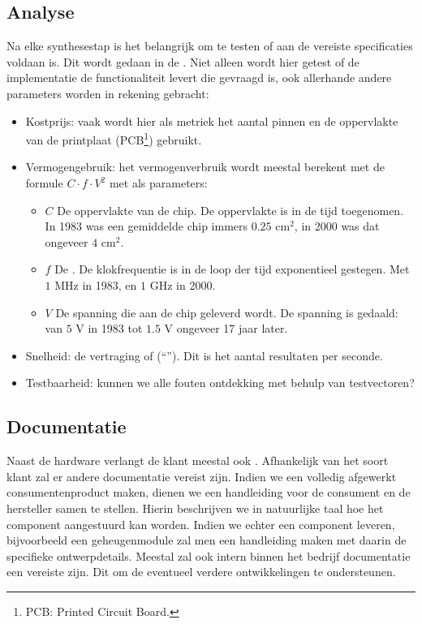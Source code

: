 \subsection{Analyse}
\label{ss:analyse}
Na elke synthesestap is het belangrijk om te testen of aan de vereiste specificaties voldaan is. Dit wordt gedaan in de . Niet alleen wordt hier getest of de implementatie de functionaliteit levert die gevraagd is, ook allerhande andere parameters worden in rekening gebracht:
\begin{itemize}
 \item Kostprijs: vaak wordt hier als metriek het aantal pinnen en de oppervlakte van de printplaat (PCB\footnote{PCB: Printed Circuit Board.}) gebruikt.
 \item Vermogengebruik: het vermogenverbruik wordt meestal berekent met de formule $C\cdot f\cdot V^2$ met als parameters:
 \begin{itemize}
  \item $C$ De oppervlakte van de chip. De oppervlakte is in de tijd toegenomen. In 1983 was een gemiddelde chip immers $0.25\mbox{ cm}^2$, in 2000 was dat ongeveer $4\mbox{ cm}^2$.
  \item $f$ De . De klokfrequentie is in de loop der tijd exponentieel gestegen. Met $1\mbox{ MHz}$ in 1983, en $1\mbox{ GHz}$ in 2000.
  \item $V$ De spanning die aan de chip geleverd wordt. De spanning is gedaald: van $5\mbox{ V}$ in 1983 tot $1.5\mbox{ V}$ ongeveer 17 jaar later.
 \end{itemize}
 \item Snelheid: de vertraging of  (``''). Dit is het aantal resultaten per seconde.
 \item Testbaarheid: kunnen we alle fouten ontdekking met behulp van testvectoren?
\end{itemize}
\subsection{Documentatie}
\label{ss:documentatie}
Naast de hardware verlangt de klant meestal ook . Afhankelijk van het soort klant zal er andere documentatie vereist zijn. Indien we een volledig afgewerkt consumentenproduct maken, dienen we een handleiding voor de consument en de hersteller samen te stellen. Hierin beschrijven we in natuurlijke taal hoe het component aangestuurd kan worden. Indien we echter een component leveren, bijvoorbeeld een geheugenmodule zal men een handleiding maken met daarin de specifieke ontwerpdetails. Meestal zal ook intern binnen het bedrijf documentatie een vereiste zijn. Dit om de eventueel verdere ontwikkelingen te ondersteunen.
